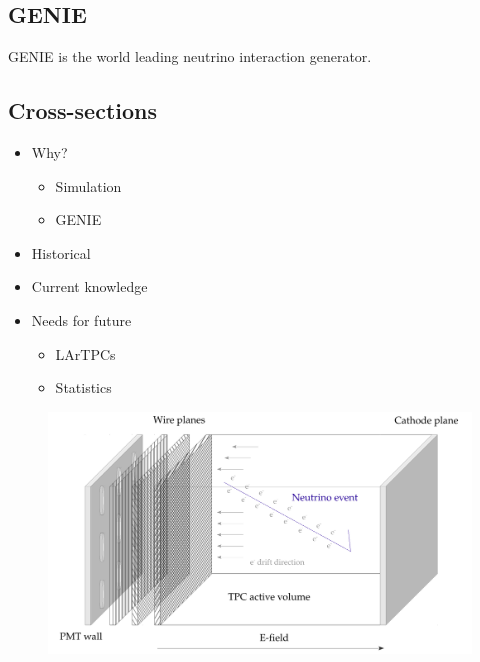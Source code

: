 \subsection{GENIE}

    GENIE is the world leading neutrino interaction generator. 

\subsection{Cross-sections}
    
    \begin{itemize}

        \item Why?
        
        \begin{itemize}

            \item Simulation
            \item GENIE

        \end{itemize}
        
        \item Historical
        \item Current knowledge
        \item Needs for future
        
        \begin{itemize}

            \item LArTPCs
            \item Statistics

        \end{itemize}

    \end{itemize}

    
    
    \begin{figure}[h!]
        \center
        \includegraphics[width=\textwidth]{images/LArTPC.pdf}
    \end{figure}

